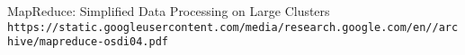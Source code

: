 \begin{thebibliography}{9}

MapReduce: Simplified Data Processing on Large Clusters
\\\texttt{https://static.googleusercontent.com/media/research.google.com/en//archive/mapreduce-osdi04.pdf}

\end{thebibliography}
